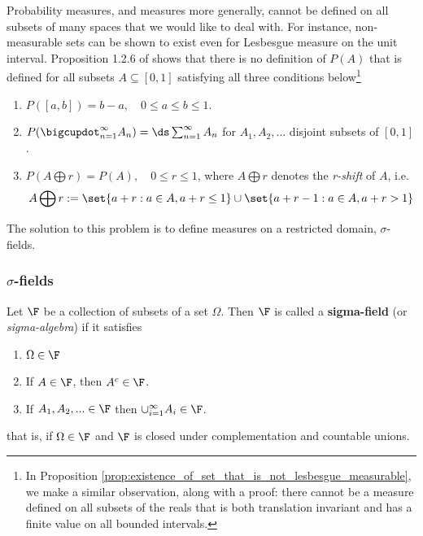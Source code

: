 \documentclass{article} %
\newcommand{\sfs}{$\sigma$-fields}
\begin{document}
Probability measures, and measures more generally, cannot be defined on all subsets of many spaces that we would like to deal with.  For instance, non-measurable sets can be shown to exist even for Lesbesgue measure on the unit interval.  Proposition 1.2.6 of \cite{rosenthal2006first} shows that there is no definition of $P(A)$ that is defined for all subsets $A \subseteq [0,1]$ satisfying all three conditions below\footnote{In Proposition \ref{prop:existence_of_set_that_is_not_lesbesgue_measurable}, we make a similar observation, along with a proof: there cannot be a measure defined on all subsets of the reals that is both translation invariant and has a finite value on all bounded intervals.}
\begin{enumerate}
\item $P([a,b]) = b-a, \quad 0 \leq a \leq b \leq 1$.	
\item $P(\bigcupdot_{n=1}^\infty A_n ) = \ds\sum_{n=1}^\infty A_n$ for $A_1, A_2, ...$ disjoint subsets of $[0,1]$.
\item $P(A \bigoplus r) = P(A), \quad 0 \leq r \leq 1$, where $A \bigoplus r$ denotes the \textit{r-shift} of $A$, i.e. 
\[ A \bigoplus r := \set{a+r : a \in A, a+r \leq 1} \cup \set{a+r-1 : a \in A, a +r >1}\]
\end{enumerate}

The solution to this problem is to define measures on a restricted domain, $\sigma$-fields.

\subsubsection{$\sigma$-fields}





\begin{definition}
Let $\F$ be a collection of subsets of a set $\Omega$.  Then $\F$ is called a \textbf{sigma-field} (or \textit{sigma-algebra}) if it satisfies

\begin{enumerate}[label=\alph*)]
	\item $\Omega \in \F$ 
	\item If $A \in \F$, then $A^c \in \F$.
	\item If $A_1,A_2, ... \in \F$ then $\cup_{i=1}^\infty A_i \in \F$.  
\end{enumerate}
that is, if $\Omega \in \F$ and $\F$ is closed under complementation and countable unions.
\label{def:sigma_field}	
\end{definition}
\end{document}
